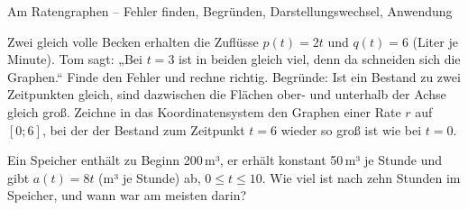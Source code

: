 \begin{aufgabe}{Am Ratengraphen – Fehler finden, Begründen, Darstellungswechsel, Anwendung}
\begin{teile}
\teil Zwei gleich volle Becken erhalten die Zuflüsse $p(t) = 2t$ und $q(t) = 6$ (Liter je Minute). Tom sagt: „Bei $t = 3$ ist in beiden gleich viel, denn da schneiden sich die Graphen.“ Finde den Fehler und rechne richtig.
\teil Begründe: Ist ein Bestand zu zwei Zeitpunkten gleich, sind dazwischen die Flächen ober- und unterhalb der Achse gleich groß.
\teil Zeichne in das Koordinatensystem den Graphen einer Rate $r$ auf $[0; 6]$, bei der der Bestand zum Zeitpunkt $t = 6$ wieder so groß ist wie bei $t = 0$.

\begin{ksys}[xmin=0,xmax=7,ymin=-4,ymax=4,xlabel=t,ylabel=r] \end{ksys}
\teil Ein Speicher enthält zu Beginn 200\,m³, er erhält konstant 50\,m³ je Stunde und gibt $a(t) = 8t$ (m³ je Stunde) ab, $0 \le t \le 10$. Wie viel ist nach zehn Stunden im Speicher, und wann war am meisten darin?
\end{teile}
\end{aufgabe}
